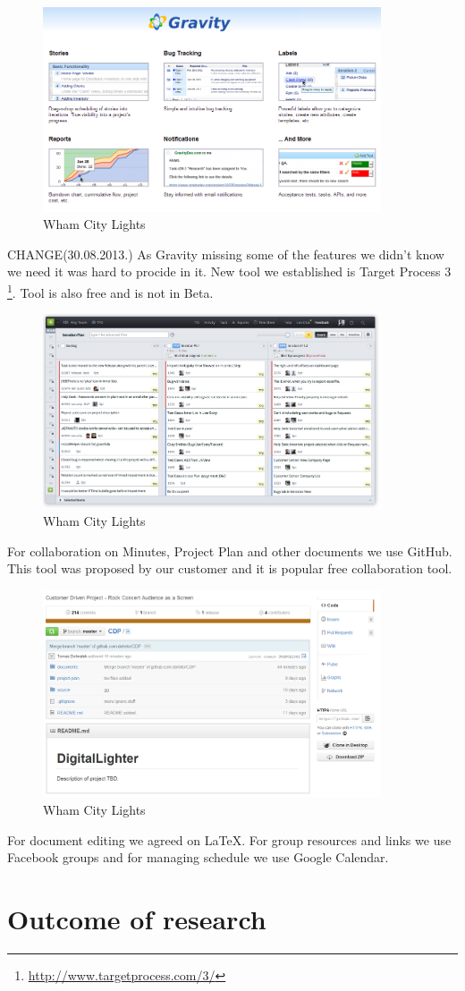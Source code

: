 \begin{figure}[!t]
	\centering
		\includegraphics[width=10cm]{preliminaryStudies/gravity.png}
	\caption{Wham City Lights}
	\label{fig:gravity}
\end{figure}


CHANGE(30.08.2013.) As Gravity missing some of the features we didn't know we need it was hard to procide in it.
New tool we established is Target Process 3 \footnote{\url{http://www.targetprocess.com/3/}}. Tool is also free and is not in Beta.

\begin{figure}[!t]
	\centering
		\includegraphics[width=10cm]{preliminaryStudies/targetp.png}
	\caption{Wham City Lights}
	\label{fig:targetp}
\end{figure}

For collaboration on Minutes, Project Plan and other documents we use GitHub. This tool was proposed by our customer and it is popular free collaboration tool.

\begin{figure}[!t]
	\centering
		\includegraphics[width=10cm]{preliminaryStudies/git.png}
	\caption{Wham City Lights}
	\label{fig:git}
\end{figure}


For document editing we agreed on LaTeX.
For group resources and links we use Facebook groups and for managing schedule we use Google Calendar.



\section{Outcome of research}
